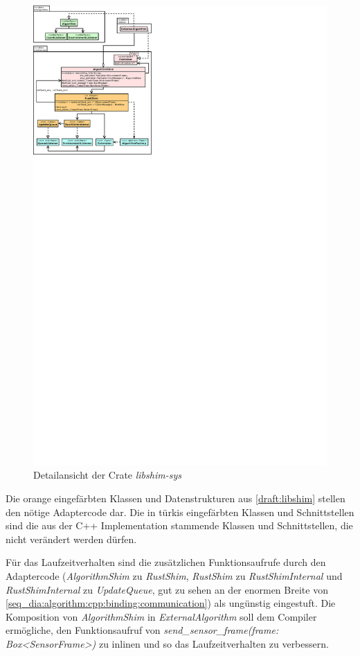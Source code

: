 \begin{figure}[H]
	\centering
	\includegraphics[width=2.5\textwidth]{dia/libshim}
	\caption{Detailansicht der Crate \textit{libshim-sys}}
	\label{draft:libshim}
\end{figure}

Die orange eingefärbten Klassen und Datenstrukturen aus \autoref{draft:libshim} stellen den nötige Adaptercode dar.
Die in türkis eingefärbten Klassen und Schnittstellen sind die aus der C++ Implementation stammende Klassen und Schnittstellen, die nicht verändert werden dürfen.

Für das Laufzeitverhalten sind die zusätzlichen Funktionsaufrufe durch den Adaptercode (\textit{AlgorithmShim} zu \textit{RustShim}, \textit{RustShim} zu \textit{RustShimInternal} und \textit{RustShimInternal} zu \textit{UpdateQueue}, gut zu sehen an der enormen Breite von \autoref{seq_dia:algorithm:cpp:binding:communication}) als ungünstig eingestuft.
Die Komposition von \textit{AlgorithmShim} in \textit{ExternalAlgorithm} soll dem Compiler ermögliche, den Funktionsaufruf von \textit{send\_sensor\_frame(frame: Box<SensorFrame>)} zu inlinen und so das Laufzeitverhalten zu verbessern.

